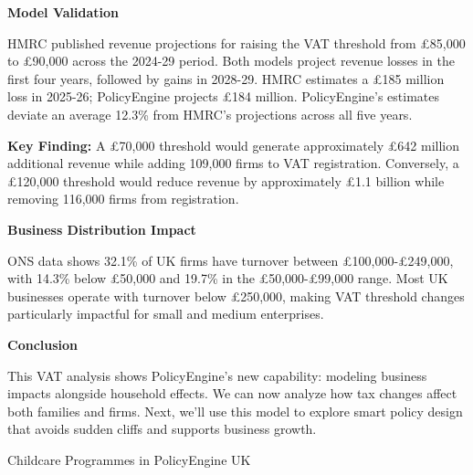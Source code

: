 \documentclass[a4paper,11pt]{article}
\newcommand{\highlightbox}[1]{%
    \begin{tcolorbox}[
        colback=lightblue,
        colframe=darkblue,
        leftrule=4mm,
        rightrule=0mm,
        toprule=0mm,
        bottomrule=0mm,
        sharp corners
    ]
    #1
    \end{tcolorbox}
}
\begin{document}
\vspace{15pt}

\textbf{Model Validation}

HMRC published revenue projections for raising the VAT threshold from £85,000 to £90,000 across the 2024-29 period. Both models project revenue losses in the first four years, followed by gains in 2028-29. HMRC estimates a £185 million loss in 2025-26; PolicyEngine projects £184 million. PolicyEngine's estimates deviate an average 12.3\% from HMRC's projections across all five years.

\vspace{15pt}

\highlightbox{
\textbf{Key Finding:} A £70,000 threshold would generate approximately £642 million additional revenue while adding 109,000 firms to VAT registration. Conversely, a £120,000 threshold would reduce revenue by approximately £1.1 billion while removing 116,000 firms from registration.
}

\vspace{15pt}

\textbf{Business Distribution Impact}

ONS data shows 32.1\% of UK firms have turnover between £100,000-£249,000, with 14.3\% below £50,000 and 19.7\% in the £50,000-£99,000 range. Most UK businesses operate with turnover below £250,000, making VAT threshold changes particularly impactful for small and medium enterprises.

\vspace{15pt}

\textbf{Conclusion}

This VAT analysis shows PolicyEngine's new capability: modeling business impacts alongside household effects. We can now analyze how tax changes affect both families and firms. Next, we'll use this model to explore smart policy design that avoids sudden cliffs and supports business growth.

\newpage

\begin{tcolorbox}[
    colback=darkblue,
    colframe=darkblue,
    rounded corners,
    fontupper=\color{white}\Large\bfseries
]
Childcare Programmes in PolicyEngine UK
\end{tcolorbox}

\vspace{15pt}

\vspace{20pt}
\end{document}
